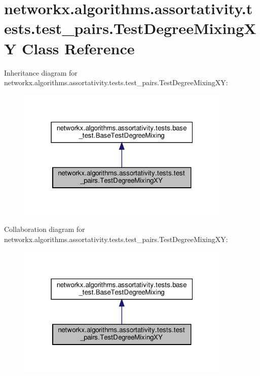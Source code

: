 \hypertarget{classnetworkx_1_1algorithms_1_1assortativity_1_1tests_1_1test__pairs_1_1TestDegreeMixingXY}{}\section{networkx.\+algorithms.\+assortativity.\+tests.\+test\+\_\+pairs.\+Test\+Degree\+Mixing\+XY Class Reference}
\label{classnetworkx_1_1algorithms_1_1assortativity_1_1tests_1_1test__pairs_1_1TestDegreeMixingXY}


Inheritance diagram for networkx.\+algorithms.\+assortativity.\+tests.\+test\+\_\+pairs.\+Test\+Degree\+Mixing\+XY\+:
\nopagebreak
\begin{figure}[H]
\begin{center}
\leavevmode
\includegraphics[width=289pt]{classnetworkx_1_1algorithms_1_1assortativity_1_1tests_1_1test__pairs_1_1TestDegreeMixingXY__inherit__graph}
\end{center}
\end{figure}


Collaboration diagram for networkx.\+algorithms.\+assortativity.\+tests.\+test\+\_\+pairs.\+Test\+Degree\+Mixing\+XY\+:
\nopagebreak
\begin{figure}[H]
\begin{center}
\leavevmode
\includegraphics[width=289pt]{classnetworkx_1_1algorithms_1_1assortativity_1_1tests_1_1test__pairs_1_1TestDegreeMixingXY__coll__graph}
\end{center}
\end{figure}
